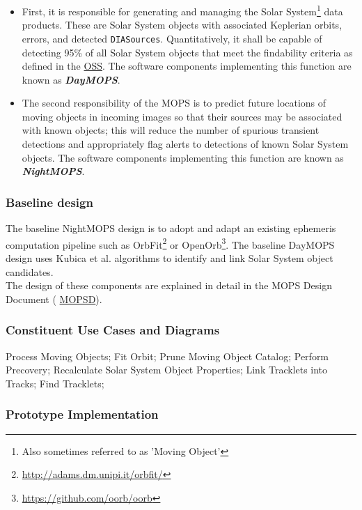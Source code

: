 \documentclass[12pt]{article}
\newcommand{\code}[1]{\texttt{#1}}
\newcommand{\DIASources}{\code{DIASources}\xspace}
\newcommand{\ds}[2]{{\color{blue} \href{https://docushare.lsstcorp.org/docushare/dsweb/Get/#1}{#2}}\xspace}
\newcommand{\OSS}{\ds{LSE-30}{OSS}}
\newcommand{\MOPSD}{\ds{LDM-156}{MOPSD}}
\begin{document}
\begin{itemize}
    \item First, it is responsible for generating and managing the Solar System\footnote{Also sometimes referred to as 'Moving Object'} data products. These are Solar System objects with associated Keplerian orbits, errors, and detected \DIASources. Quantitatively, it shall be capable of detecting 95\% of all Solar System objects that meet the findability criteria as defined in the \OSS. The software components implementing this function are known as {\bf \em DayMOPS}.
    \item The second responsibility of the MOPS is to predict future locations of moving objects in incoming images so that their sources may be associated with known objects; this will reduce the number of spurious transient detections and appropriately flag alerts to detections of known Solar System objects.  The software components implementing this function are known as {\bf \em NightMOPS}.
\end{itemize}

\subsubsection{Baseline design}

The baseline NightMOPS design is to adopt and adapt an existing ephemeris computation pipeline such as OrbFit\footnote{\url{http://adams.dm.unipi.it/orbfit/}} or OpenOrb\footnote{\url{https://github.com/oorb/oorb}}. The baseline DayMOPS design uses Kubica et al. \cite{Kubica05} algorithms to identify and link Solar System object candidates.
\\

The design of these components are explained in detail in the MOPS Design Document (\MOPSD).

\subsubsection{Constituent Use Cases and Diagrams}

Process Moving Objects;
Fit Orbit; Prune Moving Object Catalog; Perform Precovery; Recalculate Solar System Object Properties; Link Tracklets into Tracks; Find Tracklets;

\subsubsection{Prototype Implementation}
\end{document}
